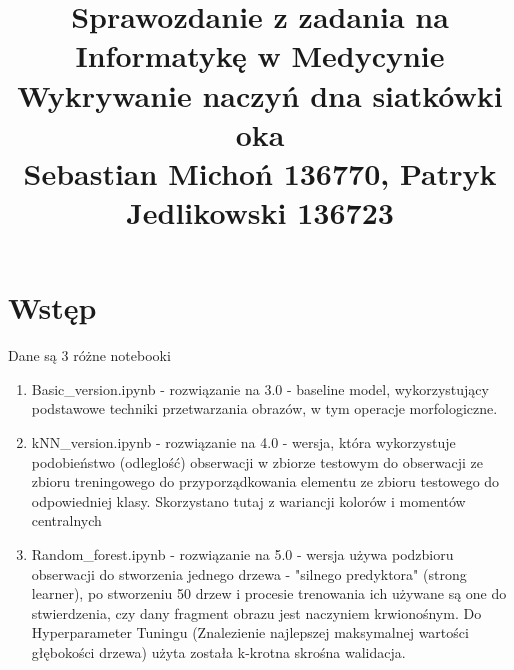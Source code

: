 \documentclass[12pt]{article}
\begin{document}
\title{Sprawozdanie z zadania na Informatykę w Medycynie\\
\large Wykrywanie naczyń dna siatkówki oka\\
\large Sebastian Michoń 136770, Patryk Jedlikowski 136723}
\date{\vspace{-10ex}}
\maketitle

\section{Wstęp}
Dane są 3 różne notebooki
\begin {enumerate}
\item Basic\_version.ipynb - rozwiązanie na 3.0 - baseline model, wykorzystujący podstawowe techniki przetwarzania obrazów, w tym operacje morfologiczne.
\item kNN\_version.ipynb - rozwiązanie na 4.0 - wersja, która wykorzystuje podobieństwo (odleglość) obserwacji w zbiorze testowym do obserwacji ze zbioru treningowego do przyporządkowania elementu ze zbioru testowego do odpowiedniej klasy. Skorzystano tutaj z wariancji kolorów i momentów centralnych
\item Random\_forest.ipynb - rozwiązanie na 5.0 - wersja używa podzbioru obserwacji do stworzenia jednego drzewa - "silnego predyktora" (strong learner), po stworzeniu 50 drzew i procesie trenowania ich używane są one do stwierdzenia, czy dany fragment obrazu jest naczyniem krwionośnym. Do Hyperparameter Tuningu (Znalezienie najlepszej maksymalnej wartości głębokości drzewa) użyta została k-krotna skrośna walidacja.
\end {enumerate}
\end{document}
